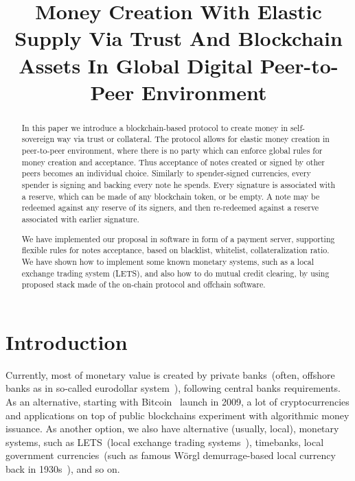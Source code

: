 \documentclass{ifcolog}
\begin{document}
\title{Money Creation With Elastic Supply Via Trust And Blockchain Assets In
Global Digital Peer-to-Peer Environment}


\authorrunning{}



\maketitle

\begin{abstract}
In this paper we introduce a blockchain-based protocol to create money in self-sovereign way via trust or collateral. The
protocol allows for elastic money creation in peer-to-peer environment, where there is no party which can enforce global
rules for money creation and acceptance. Thus acceptance of notes created or signed
by other peers becomes an individual choice. Similarly to spender-signed currencies, every spender is signing and backing every
note he spends. Every signature is associated with a reserve, which can be made of any blockchain token, or be empty. A note may
be redeemed against any reserve of its signers, and then re-redeemed against a reserve associated with earlier signature.

We have implemented our proposal in software in form of a payment server, supporting flexible rules for notes acceptance,
based on blacklist, whitelist, collateralization ratio. We have shown how to implement some known monetary systems, such as
a local exchange trading system (LETS), and also how to do mutual credit clearing, by using proposed stack made of the on-chain protocol
 and offchain software.
\end{abstract}

\section{Introduction}

Currently, most of monetary value is created by private banks~(often, offshore banks as in so-called eurodollar
system~\cite{machlup1970euro}), following central banks requirements. As an alternative, starting with
Bitcoin~\cite{nakamoto2008peer} launch in 2009, a lot of cryptocurrencies and applications on top of public
blockchains experiment with algorithmic money issuance. As another option, we also have alternative (usually, local),
monetary systems, such as LETS~(local exchange trading systems~\cite{williams1996new}), timebanks, local government
currencies~(such as famous W\"orgl demurrage-based local currency back in 1930s~\cite{unterguggenbercer1934end}), and so on.
\end{document}
